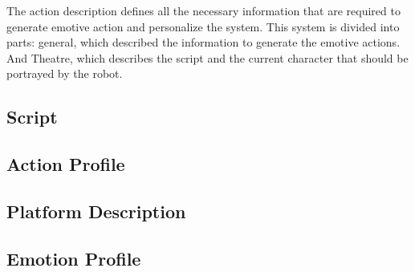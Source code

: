 The action description defines all the necessary information that are required to generate emotive action and personalize the system. This system is divided into parts: general, which described the information to generate the emotive actions. And Theatre, which describes the script and the current character that should be portrayed by the robot.
\subsection{Script}
\subsection{Action Profile}
\subsection{Platform Description}
\subsection{Emotion Profile}
